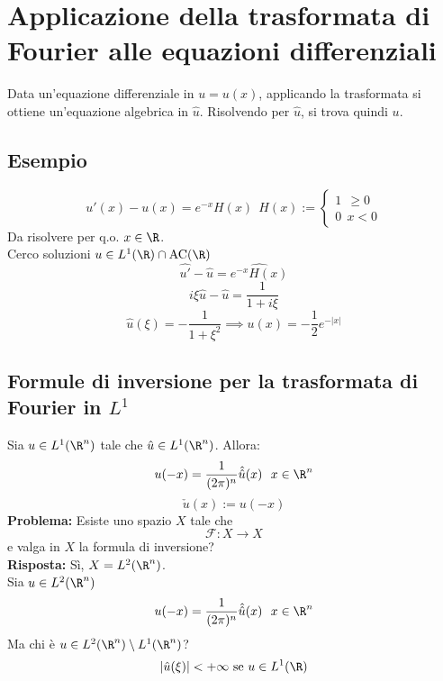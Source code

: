 
\section{Applicazione della trasformata di Fourier alle equazioni differenziali}
Data un'equazione differenziale in $u=u(x)$, applicando la trasformata si ottiene un'equazione algebrica in $\hat{u}$. Risolvendo per $\hat{u}$, si trova quindi $u$.
\subsection{Esempio} 
\[u'(x)-u(x)=e^{-x}H(x)\ \ H(x):=\begin{cases}
	1\ \ \ge 0\\
	0\ \ x<0
\end{cases}\]
Da risolvere per q.o. $x\in \R$.
\\Cerco soluzioni $u\in L^{1}(\R)\cap\text{AC}(\R)$ 
\[\hat{u'}-\hat{u}= \widehat{e^{-x}H(x)}\]
\[i\xi \hat{u}-\hat{u}=\frac{1}{1+i\xi}\]
\[\hat{u}(\xi)=-\frac{1}{1+\xi^2}\implies u(x)=-\frac{1}{2}e^{-|x|}\]
\subsection{Formule di inversione per la trasformata di Fourier in $L^1$ }
Sia $u\in L^{1}(\R^n)$ tale che $\hat{u}\in L^{1}(\R^n)$. Allora:
\[u(-x)=\frac{1}{(2\pi)^n}\hat{\hat{u}}(x)\ \ x\in \R^n\]
\[\check{u}(x):=u(-x)\]
\textbf{Problema:} Esiste uno spazio $X$ tale che 
\[\mathcal F:X\to X\]
e valga in $X$ la formula di inversione?
\\\textbf{Risposta:} Sì, $X=L^{2}(\R^n)$.
\\Sia $u\in L^{2}(\R^n)$ 
\[u(-x)=\frac{1}{(2\pi)^n}\hat{\hat{u}}(x)\ \ x\in \R^n\]
Ma chi è $u\in L^{2}(\R^n)\setminus L^{1}(\R^n)$?
\[|\hat{u}(\xi)|<+\infty\text{ se }u\in L^{1}(\R)\]
